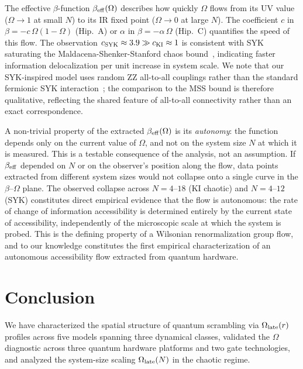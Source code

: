 \documentclass[twocolumn,showpacs,preprintnumbers,amsmath,amssymb,aps,prl]{revtex4-2}
\begin{document}
The effective $\beta$-function $\beta_{\rm eff}(\Omega)$ describes how quickly
$\Omega$ flows from its UV value ($\Omega \to 1$ at small $N$) to its IR fixed
point ($\Omega \to 0$ at large $N$). The coefficient $c$ in
$\beta = -c\,\Omega(1-\Omega)$ (Hip.~A) or $\alpha$ in $\beta = -\alpha\,\Omega$
(Hip.~C) quantifies the speed of this flow. The observation
$c_{\rm SYK} \approx 3.9 \gg c_{\rm KI} \approx 1$ is consistent with SYK
saturating the Maldacena-Shenker-Stanford chaos bound~\cite{Maldacena2016},
indicating faster information delocalization per unit increase in system scale.
We note that our SYK-inspired model uses random ZZ all-to-all couplings rather
than the standard fermionic SYK interaction~\cite{SachdevYe1993,Kitaev2015};
the comparison to the MSS bound is therefore qualitative, reflecting the shared
feature of all-to-all connectivity rather than an exact correspondence.

A non-trivial property of the extracted $\beta_{\rm eff}(\Omega)$ is its
\textit{autonomy}: the function depends only on the current value of $\Omega$,
and not on the system size $N$ at which it is measured. This is a testable
consequence of the analysis, not an assumption. If $\beta_{\rm eff}$ depended on
$N$ or on the observer's position along the flow, data points extracted from
different system sizes would not collapse onto a single curve in the
$\beta$--$\Omega$ plane. The observed collapse across $N = 4$--$18$ (KI chaotic)
and $N = 4$--$12$ (SYK) constitutes direct empirical evidence that the flow is
autonomous: the rate of change of information accessibility is determined entirely
by the current state of accessibility, independently of the microscopic scale at
which the system is probed. This is the defining property of a Wilsonian
renormalization group flow, and to our knowledge constitutes the first empirical
characterization of an autonomous accessibility flow extracted from quantum
hardware.

\section{Conclusion}

We have characterized the spatial structure of quantum scrambling via
$\Omega_{\rm late}(r)$ profiles across five models spanning three dynamical
classes, validated the $\Omega$ diagnostic across three quantum hardware platforms
and two gate technologies, and analyzed the system-size scaling
$\Omega_{\rm late}(N)$ in the chaotic regime.
\end{document}
